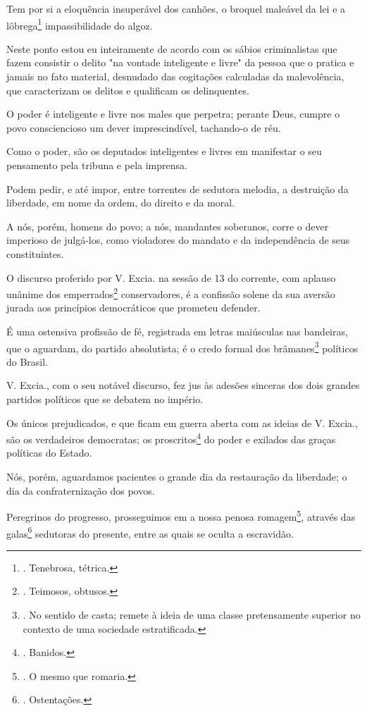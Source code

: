 Tem por si a eloquência insuperável dos canhões, o broquel maleável da
lei e a lôbrega\footnote{. Tenebrosa, tétrica.} impassibilidade do
algoz.

Neste ponto estou eu inteiramente de acordo com os sábios criminalistas
que fazem consistir o delito "na vontade inteligente e livre" da pessoa
que o pratica e jamais no fato material, desnudado das cogitações
calculadas da malevolência, que caracterizam os delitos e qualificam os
delinquentes.

O poder é inteligente e livre nos males que perpetra; perante Deus,
cumpre o povo consciencioso um dever imprescindível, tachando-o de réu.

Como o poder, são os deputados inteligentes e livres em manifestar o seu
pensamento pela tribuna e pela imprensa.

Podem pedir, e até impor, entre torrentes de sedutora melodia, a
destruição da liberdade, em nome da ordem, do direito e da moral.

A nós, porém, homens do povo; a nós, mandantes soberanos, corre o dever
imperioso de julgá-los, como violadores do mandato e da independência de
seus constituintes.

O discurso proferido por V. Excia. na sessão de 13 do corrente, com
aplauso unânime dos emperrados\footnote{. Teimosos, obtusos.}
conservadores, é a confissão solene da sua aversão jurada aos princípios
democráticos que prometeu defender.

É uma ostensiva profissão de fé, registrada em letras maiúsculas nas
bandeiras, que o aguardam, do partido absolutista; é o credo formal dos
brâmanes\footnote{. No sentido de casta; remete à ideia de uma classe
  pretensamente superior no contexto de uma sociedade estratificada.}
políticos do Brasil.

V. Excia., com o seu notável discurso, fez jus às adesões sinceras dos
dois grandes partidos políticos que se debatem no império.

Os únicos prejudicados, e que ficam em guerra aberta com as ideias de V.
Excia., são os verdadeiros democratas; os proscritos\footnote{. Banidos.}
do poder e exilados das graças políticas do Estado.

Nós, porém, aguardamos pacientes o grande dia da restauração da
liberdade; o dia da confraternização dos povos.

Peregrinos do progresso, prosseguimos em a nossa penosa
romagem\footnote{. O mesmo que romaria.}, através das galas\footnote{.
  Ostentações.} sedutoras do presente, entre as quais se oculta a
escravidão.

